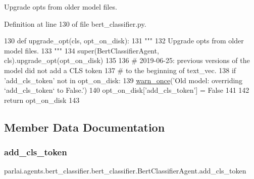 \begin{DoxyVerb}Upgrade opts from older model files.
\end{DoxyVerb}
 

Definition at line 130 of file bert\+\_\+classifier.\+py.


\begin{DoxyCode}
130     \textcolor{keyword}{def }upgrade\_opt(cls, opt\_on\_disk):
131         \textcolor{stringliteral}{"""}
132 \textcolor{stringliteral}{        Upgrade opts from older model files.}
133 \textcolor{stringliteral}{        """}
134         super(BertClassifierAgent, cls).upgrade\_opt(opt\_on\_disk)
135 
136         \textcolor{comment}{# 2019-06-25: previous versions of the model did not add a CLS token}
137         \textcolor{comment}{# to the beginning of text\_vec.}
138         \textcolor{keywordflow}{if} \textcolor{stringliteral}{'add\_cls\_token'} \textcolor{keywordflow}{not} \textcolor{keywordflow}{in} opt\_on\_disk:
139             \hyperlink{namespaceparlai_1_1utils_1_1misc_a884a3aefa90581f53bc592fa6a78dc43}{warn\_once}(\textcolor{stringliteral}{'Old model: overriding `add\_cls\_token` to False.'})
140             opt\_on\_disk[\textcolor{stringliteral}{'add\_cls\_token'}] = \textcolor{keyword}{False}
141 
142         \textcolor{keywordflow}{return} opt\_on\_disk
143 
\end{DoxyCode}


\subsection{Member Data Documentation}
\mbox{\label{classparlai_1_1agents_1_1bert__classifier_1_1bert__classifier_1_1BertClassifierAgent_a23a9fab5a21c9ee44ab416476b7f0361}} 
\subsubsection{\texorpdfstring{add\+\_\+cls\+\_\+token}{add\_cls\_token}}
{\footnotesize\ttfamily parlai.\+agents.\+bert\+\_\+classifier.\+bert\+\_\+classifier.\+Bert\+Classifier\+Agent.\+add\+\_\+cls\+\_\+token}



